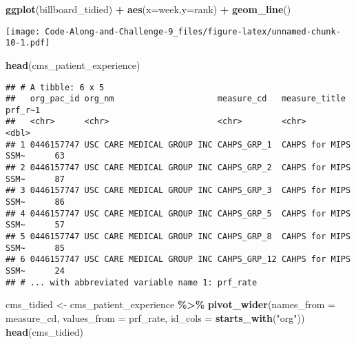 \documentclass[
]{article}
\newenvironment{Shaded}{\begin{snugshade}}{\end{snugshade}}
\newcommand{\AttributeTok}[1]{\textcolor[rgb]{0.13,0.29,0.53}{#1}}
\newcommand{\FunctionTok}[1]{\textcolor[rgb]{0.13,0.29,0.53}{\textbf{#1}}}
\newcommand{\NormalTok}[1]{#1}
\newcommand{\OtherTok}[1]{\textcolor[rgb]{0.56,0.35,0.01}{#1}}
\newcommand{\SpecialCharTok}[1]{\textcolor[rgb]{0.81,0.36,0.00}{\textbf{#1}}}
\newcommand{\StringTok}[1]{\textcolor[rgb]{0.31,0.60,0.02}{#1}}
\begin{document}
\begin{Shaded}
\begin{Highlighting}[]
\FunctionTok{ggplot}\NormalTok{(billboard\_tidied) }\SpecialCharTok{+}
 \FunctionTok{aes}\NormalTok{(}\AttributeTok{x=}\NormalTok{week,}\AttributeTok{y=}\NormalTok{rank) }\SpecialCharTok{+}
 \FunctionTok{geom\_line}\NormalTok{()}
\end{Highlighting}
\end{Shaded}

\texttt{[image: Code-Along-and-Challenge-9\_files/figure-latex/unnamed-chunk-10-1.pdf]}

\begin{Shaded}
\begin{Highlighting}[]
\FunctionTok{head}\NormalTok{(cms\_patient\_experience)}
\end{Highlighting}
\end{Shaded}

\begin{verbatim}
## # A tibble: 6 x 5
##   org_pac_id org_nm                     measure_cd   measure_title       prf_r~1
##   <chr>      <chr>                      <chr>        <chr>                 <dbl>
## 1 0446157747 USC CARE MEDICAL GROUP INC CAHPS_GRP_1  CAHPS for MIPS SSM~      63
## 2 0446157747 USC CARE MEDICAL GROUP INC CAHPS_GRP_2  CAHPS for MIPS SSM~      87
## 3 0446157747 USC CARE MEDICAL GROUP INC CAHPS_GRP_3  CAHPS for MIPS SSM~      86
## 4 0446157747 USC CARE MEDICAL GROUP INC CAHPS_GRP_5  CAHPS for MIPS SSM~      57
## 5 0446157747 USC CARE MEDICAL GROUP INC CAHPS_GRP_8  CAHPS for MIPS SSM~      85
## 6 0446157747 USC CARE MEDICAL GROUP INC CAHPS_GRP_12 CAHPS for MIPS SSM~      24
## # ... with abbreviated variable name 1: prf_rate
\end{verbatim}

\begin{Shaded}
\begin{Highlighting}[]
\NormalTok{cms\_tidied }\OtherTok{\textless{}{-}}\NormalTok{ cms\_patient\_experience }\SpecialCharTok{\%\textgreater{}\%}
  \FunctionTok{pivot\_wider}\NormalTok{(}\AttributeTok{names\_from =}\NormalTok{ measure\_cd,}
 \AttributeTok{values\_from =}\NormalTok{ prf\_rate,}
 \AttributeTok{id\_cols =} \FunctionTok{starts\_with}\NormalTok{(}\StringTok{"org"}\NormalTok{))}
\FunctionTok{head}\NormalTok{(cms\_tidied)}
\end{Highlighting}
\end{Shaded}
\end{document}
